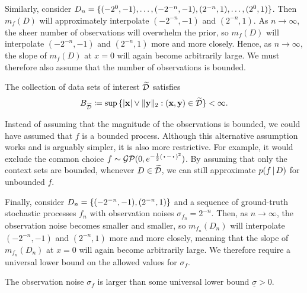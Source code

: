 \documentclass[12pt, twoside]{report}
\begin{document}
Similarly, consider $D_n = \{(-2^{0}, -1),\ldots, (-2^{-n}, -1), (2^{-n}, 1), \ldots, (2^0, 1)\}$.
Then $m_f(D)$ will approximately interpolate $(-2^{-n}, -1)$ and $(2^{-n}, 1)$.
As $n \to \infty$, the sheer number of observations will overwhelm the prior,
so $m_f(D)$ will interpolate $(-2^{-n}, -1)$ and $(2^{-n}, 1)$ more and more closely.
Hence, as $n \to \infty$, the slope of $m_f(D)$ at $x = 0$ will again become arbitrarily large.
We must therefore also assume that the number of observations is bounded.

\begin{assumption}
    \label{assum:context_boundedness}
    The collection of data sets of interest $\widetilde{\mathcal{D}}$ satisfies
    \begin{equation}
        B_{\widetilde{\mathcal{D}}} \coloneqq \operatorname*{sup}\,\{\lvert\mathbf{x}\rvert \lor \lVert\mathbf{y}\rVert_2 : (\mathbf{x}, \mathbf{y}) \in \widetilde{\mathcal{D}}\} < \infty.
    \end{equation}
\end{assumption}

Instead of assuming that the magnitude of the observations is bounded, we could have assumed that $f$ is a bounded process.
Although this alternative assumption works and is arguably simpler, it is also more restrictive.
For example, it would exclude the common choice $f \sim \GP(0, e^{-\frac12(\vardot - \vardot)^2})$.
By assuming that only the context sets are bounded, whenever $D \in \widetilde{\mathcal{D}}$, we can still approximate $p(f \,|\, D)$ for unbounded $f$.

Finally, consider $D_n = \{(-2^{-n}, -1), (2^{-n}, 1)\}$ and a sequence of ground-truth stochastic processes $f_n$ with observation noises $\sigma_{f_n} = 2^{-n}$.
Then, as $n \to \infty$, the observation noise becomes smaller and smaller, so $m_{f_n}(D_n)$ will interpolate $(-2^{-n}, -1)$ and $(2^{-n}, 1)$ more and more closely, meaning that the slope of $m_{f_n}(D_n)$ at $x = 0$ will again become arbitrarily large.
We therefore require a universal lower bound on the allowed values for $\sigma_f$.

\begin{assumption} \label{assum:noise_boundedness}
    The observation noise $\sigma_f$ is larger than some universal lower bound $\underline{\sigma} > 0$.
\end{assumption}
\end{document}
